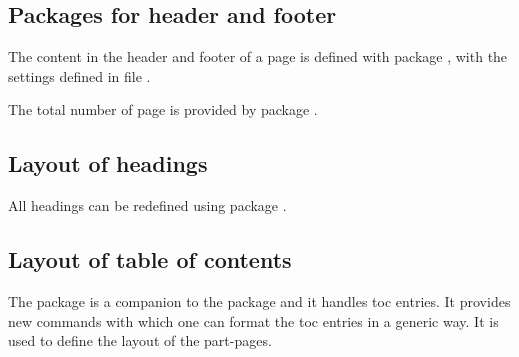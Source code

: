 
\subsection{Packages for header and footer}
\label{sec:packages:headfoot}

The content in the header and footer of a page is defined with package 
, with the settings defined in file 
.

The total number of page is provided by package .



\subsection{Layout of headings}
\label{sec:packages:headings}

All headings can be redefined using package .


\subsection{Layout of table of contents}
\label{sec:packages:TOC}

The  package is a companion to the  package and it handles toc entries. It provides new commands with which one
can format the toc entries in a generic way. It is used to define the layout of the part-pages.



